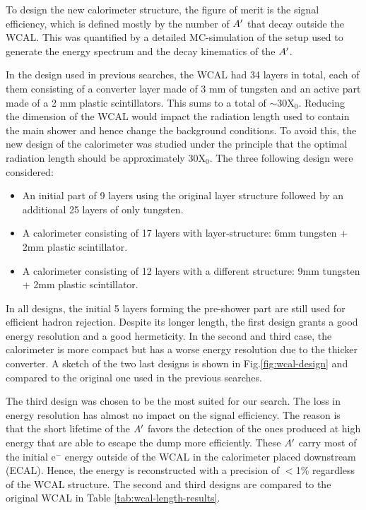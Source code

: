To design the new calorimeter structure, the figure of merit is the signal efficiency, which is defined mostly by the number of $A'$ that decay outside the WCAL. This was quantified by a detailed MC-simulation of the setup used to generate the energy spectrum and the decay kinematics of the $A'$.

In the design used in previous searches, the WCAL had 34 layers in total, each of them consisting of a converter layer made of 3 mm of tungsten and an active part made of a 2 mm plastic scintillators. This sums to a total of $\sim$30X$_0$. Reducing the dimension of the WCAL would impact the radiation length used to contain the main shower and hence change the background conditions. To avoid this, the new design of the calorimeter was studied under the principle that the optimal radiation length should be approximately 30X$_0$. The three following design were considered:

\begin{itemize}
\item An initial part of 9 layers using the original layer structure followed by an additional 25 layers of only tungsten.
\item A calorimeter consisting of 17 layers with layer-structure: 6mm tungsten + 2mm plastic scintillator.
\item A calorimeter consisting of 12 layers with a different structure: 9mm tungsten + 2mm plastic scintillator.
\end{itemize}

In all designs, the initial 5 layers forming the pre-shower part are still used for efficient hadron rejection. Despite its longer length, the first design grants a good energy resolution and a good hermeticity. In the second and third case, the calorimeter is more compact but has a worse energy resolution due to the thicker converter. A sketch of the two last designs is shown in Fig.\ref{fig:wcal-design} and compared to the original one used in the previous searches.

The third design was chosen to be the most suited for our search. The loss in energy resolution has almost no impact on the signal efficiency. The reason is that the short lifetime of the $A'$ favors the detection of the ones produced at high energy that are able to escape the dump more efficiently. These $A'$ carry most of the initial e$^-$ energy outside of the WCAL in the calorimeter placed downstream (ECAL). Hence, the energy is reconstructed with a precision of $<$1\% regardless of the WCAL structure. The second and third designs are compared to the original WCAL in Table \ref{tab:wcal-length-results}.

